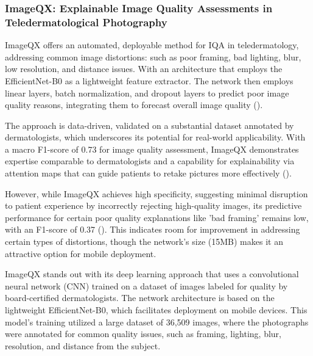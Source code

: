 \subsubsection{ImageQX: Explainable Image Quality Assessments in Teledermatological Photography}
\label{subsub:ImageQX}
ImageQX offers an automated, deployable method for IQA in teledermatology, addressing common image distortions: such as poor framing, bad lighting, blur, low resolution, and distance issues. With an architecture that employs the EfficientNet-B0 as a lightweight feature extractor. The network then employs linear layers, batch normalization, and dropout layers to predict poor image quality reasons, integrating them to forecast overall image quality (\cite{ImageQX}).
\par
\vspace{\baselineskip}
\noindent
The approach is data-driven, validated on a substantial dataset annotated by dermatologists, which underscores its potential for real-world applicability. With a macro F1-score of 0.73 for image quality assessment, ImageQX demonstrates expertise comparable to dermatologists and a capability for explainability via attention maps that can guide patients to retake pictures more effectively (\cite{ImageQX}).
\par
\vspace{\baselineskip}
\noindent
However, while ImageQX achieves high specificity, suggesting minimal disruption to patient experience by incorrectly rejecting high-quality images, its predictive performance for certain poor quality explanations like 'bad framing' remains low, with an F1-score of 0.37 (\cite{ImageQX}). This indicates room for improvement in addressing certain types of distortions, though the network’s size (15MB) makes it an attractive option for mobile deployment.
\par
\vspace{\baselineskip}
\vspace{\baselineskip}
\noindent
ImageQX stands out with its deep learning approach that uses a convolutional neural network (CNN) trained on a dataset of images labeled for quality by board-certified dermatologists. The network architecture is based on the lightweight EfficientNet-B0, which facilitates deployment on mobile devices. This model's training utilized a large dataset of 36,509 images, where the photographs were annotated for common quality issues, such as framing, lighting, blur, resolution, and distance from the subject.
\par
\vspace{\baselineskip}

